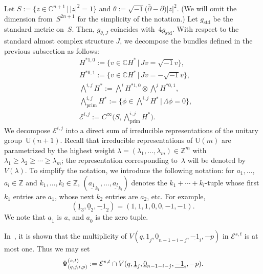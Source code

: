 \documentclass[10pt,a4paper]{amsart}
\numberwithin{equation}{section}
\DeclareMathOperator{\prim}{prim}
\newcommand{\bC}{\mathbb{C}}
\newcommand{\cE}{\mathcal{E}}
\begin{document}
Let $S :=\{ z \in \bC^{n+1} \,|\, |z|^2 =1 \}$
and
$\theta:= \sqrt{-1} \big(\bar{\partial } - \partial \big)|z|^2$.
(We will omit the dimension from~$S^{2n+1}$ for the simplicity of the notation.)
Let $g_{\mathrm{std}}$ be the standard metric on~$S$.
Then, $g_{\theta , J}$ coincides with~$4 g_{\mathrm{std}}$.
With respect to the standard almost complex structure $J$, we decompose the bundles defined in the previous subsection as follows:
\begin{align*}
& H^{* 1,0}:= \big\{ v \in \bC H^* \,|\, Jv = \sqrt{-1} v \big\} , \\
%
%
& H^{* 0,1} := \big\{ v \in \bC H^* \,|\, Jv = - \sqrt{-1} v \big\}, \\
%
%
& \textstyle \bigwedge^{i, j} H^* := \textstyle \bigwedge^{i} H^{* 1,0} \otimes \textstyle \bigwedge^{j} H^{* 0,1} , \\
%
%
& \textstyle \bigwedge_{\prim}^{i, j} H^* := \big\{ \phi \in \textstyle \bigwedge^{i, j} H^* \, \big| \, \Lambda \phi =0 \big\} , \\
%
%
%
%
& \cE ^{i, j} := C^{\infty} \big( S, \textstyle \bigwedge_{\prim}^{i, j} H^* \big).
\end{align*}
%
We decompose $\cE ^{i,j} $ into a direct sum of irreducible representations of the unitary group~$\mathrm{U} (n+1)$.
Recall that
irreducible representations of $\mathrm{U} (m)$ are parametrized by the highest weight $\lambda = (\lambda_1 , \ldots , \lambda_m ) \in \mathbb{Z}^m$ with $\lambda_1 \geq \lambda_2 \geq \cdots \geq \lambda_m$; the representation corresponding to~$\lambda$ will be denoted by
$ V ( \lambda ) $.
To simplify the notation, we introduce the following notation:
for $a_1, \ldots $, $a_l \in \mathbb{Z}$ and $k_1, \ldots , k_l \in \mathbb{Z}$, $(\underline{a_1}_{k_1}, \dots , \underline{a_l}_{k_l})$ denotes the $k_1 + \cdots + k_l $-tuple
whose first $k_1$ entries are $a_1$, whose next $k_2$ entries are $a_2$, etc.
For example,{\samepage
\[
(\underline{1}_{3}, \underline{0}_{2}, \underline{-1}_{2} ) = (1, 1, 1, 0, 0, -1, -1 ).
\]
We note that $\underline{a}_{1}$ is $a$, and $\underline{a}_{0}$ is the zero tuple.}

In~\cite{Julg-Kasparov-95}, it is shown that
the multiplicity of $V (q, \underline{1}_{j}, \underline{0}_{n-1-i-j}, \underline{-1}_{i}, -p )$ in $\cE ^{s,t}$
is at most one.
Thus we may set
\begin{equation}
\Psi_{(q , j , i , p )}^{(s, t)}
:= \cE ^{s,t}
\cap V (q, \underline{1}_{j}, \underline{0}_{n-1-i-j}, \underline{-1}_{i}, -p )
.
\notag
\end{equation}
\end{document}
